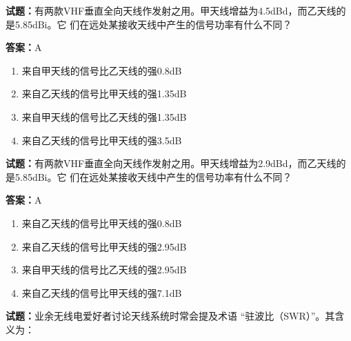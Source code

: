 \documentclass{ctexbook}
\begin{document}




\vspace{1em}

\textbf{试题：}有两款VHF垂直全向天线作发射之用。甲天线增益为4.5dBd，而乙天线的是5.85dBi。它
们在远处某接收天线中产生的信号功率有什么不同？ 

\textbf{答案：}A 


\begin{enumerate}[leftmargin=3em]
  \item 来自甲天线的信号比乙天线的强0.8dB 

  \item 来自乙天线的信号比甲天线的强1.35dB 

  \item 来自甲天线的信号比乙天线的强1.35dB 

  \item 来自乙天线的信号比甲天线的强3.5dB 

\end{enumerate}





\vspace{1em}

\textbf{试题：}有两款VHF垂直全向天线作发射之用。甲天线增益为2.9dBd，而乙天线的是5.85dBi。它
们在远处某接收天线中产生的信号功率有什么不同？ 

\textbf{答案：}A 

\begin{enumerate}[leftmargin=3em]
  \item 来自乙天线的信号比甲天线的强0.8dB 

  \item 来自乙天线的信号比甲天线的强2.95dB 

  \item 来自甲天线的信号比乙天线的强2.95dB 

  \item 来自乙天线的信号比甲天线的强7.1dB 

\end{enumerate}





\vspace{1em}

\textbf{试题：}业余无线电爱好者讨论天线系统时常会提及术语 “驻波比（SWR）”。其含义为： 
\end{document}
